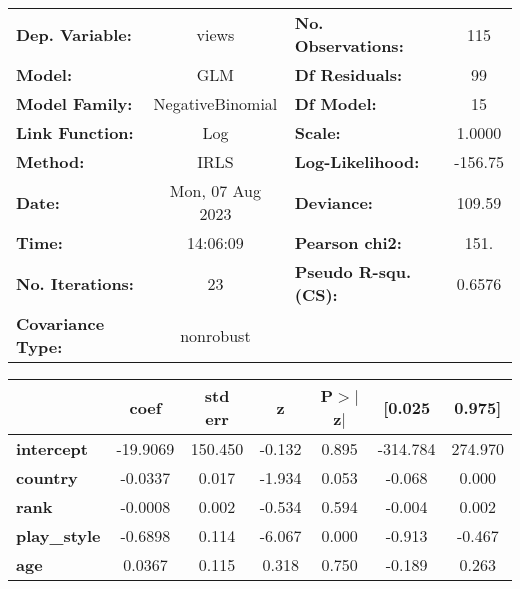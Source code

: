 \begin{center}
\begin{tabular}{lclc}
\toprule
\textbf{Dep. Variable:}           &      views       & \textbf{  No. Observations:  } &      115    \\
\textbf{Model:}                   &       GLM        & \textbf{  Df Residuals:      } &       99    \\
\textbf{Model Family:}            & NegativeBinomial & \textbf{  Df Model:          } &       15    \\
\textbf{Link Function:}           &       Log        & \textbf{  Scale:             } &    1.0000   \\
\textbf{Method:}                  &       IRLS       & \textbf{  Log-Likelihood:    } &   -156.75   \\
\textbf{Date:}                    & Mon, 07 Aug 2023 & \textbf{  Deviance:          } &    109.59   \\
\textbf{Time:}                    &     14:06:09     & \textbf{  Pearson chi2:      } &     151.    \\
\textbf{No. Iterations:}          &        23        & \textbf{  Pseudo R-squ. (CS):} &   0.6576    \\
\textbf{Covariance Type:}         &    nonrobust     & \textbf{                     } &             \\
\bottomrule
\end{tabular}
\begin{tabular}{lcccccc}
                                  & \textbf{coef} & \textbf{std err} & \textbf{z} & \textbf{P$> |$z$|$} & \textbf{[0.025} & \textbf{0.975]}  \\
\midrule
\textbf{intercept}                &     -19.9069  &      150.450     &    -0.132  &         0.895        &     -314.784    &      274.970     \\
\textbf{country}                  &      -0.0337  &        0.017     &    -1.934  &         0.053        &       -0.068    &        0.000     \\
\textbf{rank}                     &      -0.0008  &        0.002     &    -0.534  &         0.594        &       -0.004    &        0.002     \\
\textbf{play\_style}              &      -0.6898  &        0.114     &    -6.067  &         0.000        &       -0.913    &       -0.467     \\
\textbf{age}                      &       0.0367  &        0.115     &     0.318  &         0.750        &       -0.189    &        0.263     \\

\end{tabular}
\end{center}
